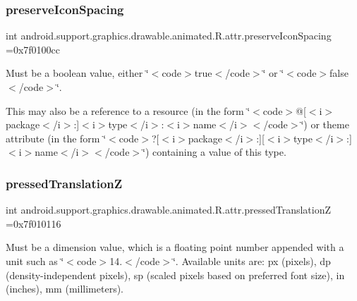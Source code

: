 \subsubsection{\texorpdfstring{preserve\+Icon\+Spacing}{preserveIconSpacing}}
{\footnotesize\ttfamily int android.\+support.\+graphics.\+drawable.\+animated.\+R.\+attr.\+preserve\+Icon\+Spacing =0x7f0100cc\hspace{0.3cm}{\ttfamily [static]}}

Must be a boolean value, either \char`\"{}$<$code$>$true$<$/code$>$\char`\"{} or \char`\"{}$<$code$>$false$<$/code$>$\char`\"{}. 

This may also be a reference to a resource (in the form \char`\"{}$<$code$>$@\mbox{[}$<$i$>$package$<$/i$>$\+:\mbox{]}$<$i$>$type$<$/i$>$\+:$<$i$>$name$<$/i$>$$<$/code$>$\char`\"{}) or theme attribute (in the form \char`\"{}$<$code$>$?\mbox{[}$<$i$>$package$<$/i$>$\+:\mbox{]}\mbox{[}$<$i$>$type$<$/i$>$\+:\mbox{]}$<$i$>$name$<$/i$>$$<$/code$>$\char`\"{}) containing a value of this type. \mbox{\label{classandroid_1_1support_1_1graphics_1_1drawable_1_1animated_1_1R_1_1attr_a898fa8e367e2dab5497648745b740d65}} 
\subsubsection{\texorpdfstring{pressed\+TranslationZ}{pressedTranslationZ}}
{\footnotesize\ttfamily int android.\+support.\+graphics.\+drawable.\+animated.\+R.\+attr.\+pressed\+TranslationZ =0x7f010116\hspace{0.3cm}{\ttfamily [static]}}

Must be a dimension value, which is a floating point number appended with a unit such as \char`\"{}$<$code$>$14.\+5sp$<$/code$>$\char`\"{}. Available units are\+: px (pixels), dp (density-\/independent pixels), sp (scaled pixels based on preferred font size), in (inches), mm (millimeters). 

